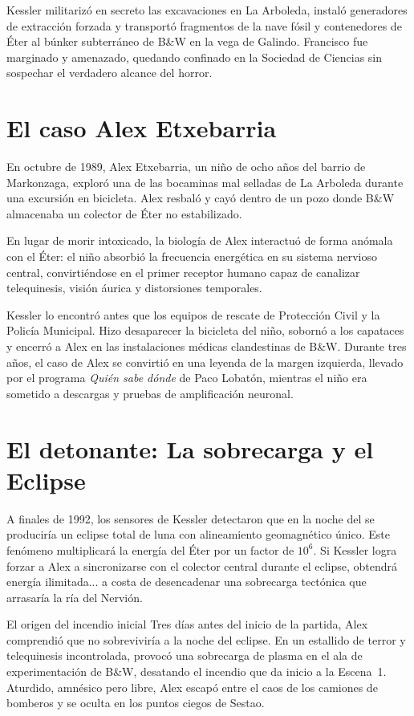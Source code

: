 Kessler militarizó en secreto las excavaciones en La Arboleda, instaló generadores de extracción forzada y transportó fragmentos de la nave fósil y contenedores de Éter al búnker subterráneo de B\&W en la vega de Galindo. Francisco fue marginado y amenazado, quedando confinado en la Sociedad de Ciencias sin sospechar el verdadero alcance del horror.

\section{El caso Alex Etxebarria}

En octubre de 1989, Alex Etxebarria, un niño de ocho años del barrio de Markonzaga, exploró una de las bocaminas mal selladas de La Arboleda durante una excursión en bicicleta. Alex resbaló y cayó dentro de un pozo donde B\&W almacenaba un colector de Éter no estabilizado.

En lugar de morir intoxicado, la biología de Alex interactuó de forma anómala con el Éter: el niño absorbió la frecuencia energética en su sistema nervioso central, convirtiéndose en el primer receptor humano capaz de canalizar telequinesis, visión áurica y distorsiones temporales.

Kessler lo encontró antes que los equipos de rescate de Protección Civil y la Policía Municipal. Hizo desaparecer la bicicleta del niño, sobornó a los capataces y encerró a Alex en las instalaciones médicas clandestinas de B\&W. Durante tres años, el caso de Alex se convirtió en una leyenda de la margen izquierda, llevado por el programa \emph{Quién sabe dónde} de Paco Lobatón, mientras el niño era sometido a descargas y pruebas de amplificación neuronal.

\section{El detonante: La sobrecarga y el Eclipse}

A finales de 1992, los sensores de Kessler detectaron que en la noche del  se produciría un eclipse total de luna con alineamiento geomagnético único. Este fenómeno multiplicará la energía del Éter por un factor de $10^6$. Si Kessler logra forzar a Alex a sincronizarse con el colector central durante el eclipse, obtendrá energía ilimitada... a costa de desencadenar una sobrecarga tectónica que arrasaría la ría del Nervión.

\begin{CajaEter}{El origen del incendio inicial}
Tres días antes del inicio de la partida, Alex comprendió que no sobreviviría a la noche del eclipse. En un estallido de terror y telequinesis incontrolada, provocó una sobrecarga de plasma en el ala de experimentación de B\&W, desatando el incendio que da inicio a la Escena~1. Aturdido, amnésico pero libre, Alex escapó entre el caos de los camiones de bomberos y se oculta en los puntos ciegos de Sestao.
\end{CajaEter}
